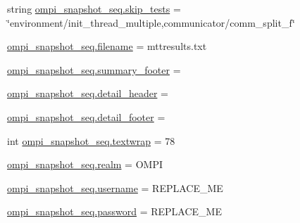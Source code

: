 \begin{DoxyCompactItemize}
\item 
string \hyperlink{namespaceompi__snapshot__seq_a0a1e6182d0b6b408fd0b3642c5b52556}{ompi\-\_\-snapshot\-\_\-seq.\-skip\-\_\-tests} = \char`\"{}environment/init\-\_\-thread\-\_\-multiple,communicator/comm\-\_\-split\-\_\-f\char`\"{}
\item 
\hyperlink{namespaceompi__snapshot__seq_ac375b04988441d39d7dbd8546bede172}{ompi\-\_\-snapshot\-\_\-seq.\-filename} = mttresults.\-txt
\item 
\hyperlink{namespaceompi__snapshot__seq_ae564d5d2ad344e6edd9fe25c04553c4f}{ompi\-\_\-snapshot\-\_\-seq.\-summary\-\_\-footer} =
\item 
\hyperlink{namespaceompi__snapshot__seq_aa8131df6b7e79ce54a5832a78a18226b}{ompi\-\_\-snapshot\-\_\-seq.\-detail\-\_\-header} =
\item 
\hyperlink{namespaceompi__snapshot__seq_a0238cbbb945d76de96b90e3cd058d356}{ompi\-\_\-snapshot\-\_\-seq.\-detail\-\_\-footer} =
\item 
int \hyperlink{namespaceompi__snapshot__seq_a81239e350a24a25aa3a329f330a267f4}{ompi\-\_\-snapshot\-\_\-seq.\-textwrap} = 78
\item 
\hyperlink{namespaceompi__snapshot__seq_aab43e86098df5461b6d69d6554bacf51}{ompi\-\_\-snapshot\-\_\-seq.\-realm} = O\-M\-P\-I
\item 
\hyperlink{namespaceompi__snapshot__seq_ad73553bb8a0851422895d9c7e8978b83}{ompi\-\_\-snapshot\-\_\-seq.\-username} = R\-E\-P\-L\-A\-C\-E\-\_\-\-M\-E
\item 
\hyperlink{namespaceompi__snapshot__seq_a6229810db63f8ab2e0598c9dc5da7a32}{ompi\-\_\-snapshot\-\_\-seq.\-password} = R\-E\-P\-L\-A\-C\-E\-\_\-\-M\-E
\end{DoxyCompactItemize}
